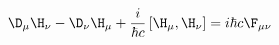 \begin{equation}
  \label{eq:IntCond}
  \D_\mu\H_\nu-\D_\nu\H_\mu + \frac{i}{\hbar c}\left[\H_\mu,\H_\nu \right]=i\hbar c \F_{\mu\nu}
\end{equation}


